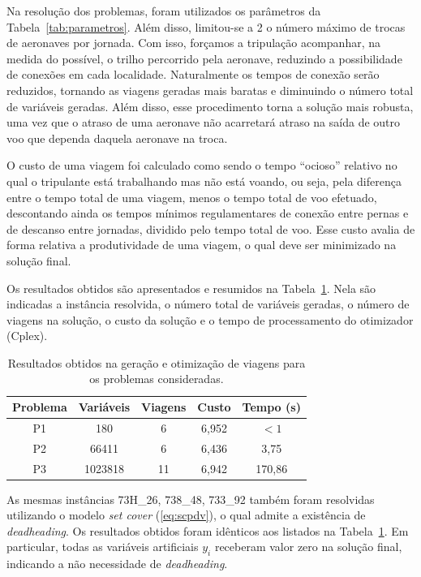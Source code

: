 Na resolução dos problemas, foram utilizados os parâmetros da Tabela~\ref{tab:parametros}. Além
disso, limitou-se a 2 o número máximo de trocas de aeronaves por jornada. Com isso, forçamos a
tripulação acompanhar, na medida do possível, o trilho percorrido pela aeronave, reduzindo a
possibilidade de conexões em cada localidade. Naturalmente os tempos de conexão serão reduzidos,
tornando as viagens geradas mais baratas e diminuindo o número total de variáveis geradas. Além
disso, esse procedimento torna a solução mais robusta, uma vez que o atraso de uma aeronave não
acarretará atraso na saída de outro voo que dependa daquela aeronave na troca.

O custo de uma viagem foi calculado como sendo o tempo ``ocioso'' relativo no qual o tripulante está 
trabalhando mas não está voando, ou seja, pela diferença entre o tempo total de uma viagem, menos o 
tempo total de voo efetuado, descontando ainda os tempos mínimos regulamentares de conexão entre 
pernas e de descanso entre jornadas, dividido pelo tempo total de voo. Esse custo avalia de forma 
relativa a produtividade de uma viagem, o qual deve ser minimizado na solução final.

Os resultados obtidos são apresentados e resumidos na Tabela~\ref{tab:resultados}. Nela são 
indicadas a instância resolvida, o número total de variáveis geradas, o número de viagens na 
solução, o custo da solução e o tempo de processamento do otimizador (Cplex).

\begin{table}[htb]
	\begin{center} 
		\begin{tabular}{|c|c|c|c|c|}
			\hline 
			{\bf Problema} & {\bf Variáveis} & {\bf Viagens} & {\bf Custo} & {\bf Tempo (s)} \\ 
			\hline \hline
			P1 & 180 & 6 & 6,952 & $< 1$ \\ 
			P2 & 66411 & 6 & 6,436 & 3,75 \\
			P3 & 1023818 & 11 & 6,942 & 170,86 \\ \hline
		\end{tabular}
		\caption{Resultados obtidos na geração e otimização de viagens para os problemas consideradas.}
		\label{tab:resultados}
	\end{center}
\end{table}

As mesmas instâncias 73H\_26, 738\_48, 733\_92 também foram resolvidas utilizando o modelo {\it set
cover} (\ref{eq:scpdv}), o qual admite a existência de {\it deadheading}. Os resultados obtidos
foram idênticos aos listados na Tabela~\ref{tab:resultados}. Em particular, todas as variáveis
artificiais $y_i$ receberam valor zero na solução final, indicando a não necessidade de {\it
deadheading}.

